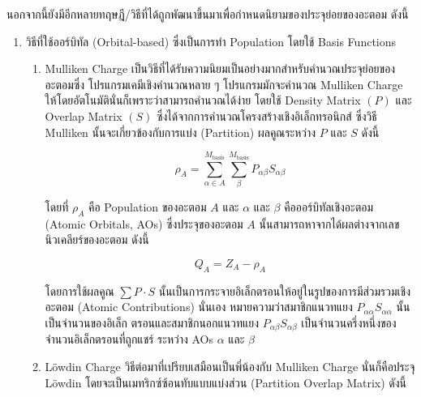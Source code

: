 นอกจากนี้ยังมีอีกหลายทฤษฎี/วิธีที่ได้ถูกพัฒนาขึ้นมาเพื่อกำหนดนิยามของประจุย่อยของอะตอม ดังนี้
%
\begin{enumerate}[topsep=0pt,noitemsep]\setlength\itemsep{0.5em}
    \item วิธีที่ใช้ออร์บิทัล (Orbital-based) ซึ่งเป็นการทำ Population โดยใช้ Basis Functions
          \begin{enumerate}
              \item Mulliken Charge\autocite{szabo1996} เป็นวิธีที่ได้รับความนิยมเป็นอย่างมากสำหรับคำนวณประจุย่อยของอะตอมซึ่ง%
                    โปรแกรมเคมีเชิงคำนวณหลาย ๆ โปรแกรมมักจะคำนวณ Mulliken Charge ให้โดยอัตโนมัตินั่นก็เพราะว่าสามารถคำนวณได้ง่าย%
                    โดยใช้ Density Matrix $(P)$ และ Overlap Matrix $(S)$ ซึ่งได้จากการคำนวณโครงสร้างเชิงอิเล็กทรอนิกส์ ซึ่งวิธี
                    Mulliken นั้นจะเกี่ยวข้องกับการแบ่ง (Partition) ผลคูณระหว่าง $P$ และ $S$ ดังนี้

                    \begin{equation}\label{eq:mulliken_pop}
                        \rho_{A} = \sum^{M_{\text{basis}}}_{\alpha \in A} \sum^{M_{\text{basis}}}_{\beta}
                        P_{\alpha\beta} S_{\alpha\beta}
                    \end{equation}

                    \noindent โดยที่ $\rho_{A}$ คือ Population ของอะตอม $A$ และ $\alpha$ และ $\beta$ คือออร์บิทัลเชิงอะตอม
                    (Atomic Orbitals, AOs) ซึ่งประจุของอะตอม $A$ นั้นสามารถหาจากได้ผลต่างจากเลขนิวเคลียร์ของอะตอม ดังนี้

                    \begin{equation}\label{eq:mulliken_charge}
                        Q_{A} = Z_{A} - \rho_{A}
                    \end{equation}

                    \noindent โดยการใช้ผลคูณ $\sum P \cdot S$ นั้นเป็นการกระจายอิเล็กตรอนให้อยู่ในรูปของการมีส่วมรวมเชิงอะตอม (Atomic
                    Contributions) นั่นเอง หมายความว่าสมาชิกแนวทแยง $P_{\alpha\alpha} S_{\alpha\alpha}$ นั้นเป็นจำนวนของอิเล็ก%
                    ตรอนและสมาชิกนอกแนวทแยง $P_{\alpha\beta} S_{\alpha\beta}$ เป็นจำนวนครึ่งหนึ่งของจำนวนอิเล็กตรอนที่ถูกแชร์%
                    ระหว่าง AOs $\alpha$ และ $\beta$

              \item L\"{o}wdin Charge\autocite{lowdin1950} วิธีต่อมาที่เปรียบเสมือนเป็นพี่น้องกับ Mulliken Charge นั่นก็คือประจุ
                    L\"{o}wdin โดยจะเป็นเมทริกซ์ซ้อนทับแบบแบ่งส่วน (Partition Overlap Matrix) ดังนี้


\end{enumerate}
\end{enumerate}
